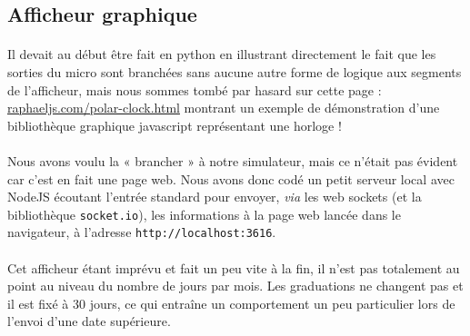 \documentclass{article}
\begin{document}
\subsection{Afficheur graphique}
\paragraph{}Il devait au début être fait en python en illustrant directement le fait que les sorties du micro sont branchées sans aucune autre forme de logique aux segments de l'afficheur, mais nous sommes tombé par hasard sur cette page : \url{raphaeljs.com/polar-clock.html} montrant un exemple de démonstration d'une bibliothèque graphique javascript représentant une horloge !

\paragraph{}Nous avons voulu la « brancher » à notre simulateur, mais ce n'était pas évident car c'est en fait une page web. Nous avons donc codé un petit serveur local avec NodeJS écoutant l'entrée standard pour envoyer, \emph{via} les web sockets (et la bibliothèque \texttt{socket.io}), les informations à la page web lancée dans le navigateur, à l'adresse \texttt{http://localhost:3616}.

\paragraph{}Cet afficheur étant imprévu et fait un peu vite à la fin, il n'est pas totalement au point au niveau du nombre de jours par mois. Les graduations ne changent pas et il est fixé à 30 jours, ce qui entraîne un comportement un peu particulier lors de l'envoi d'une date supérieure.
\end{document}
